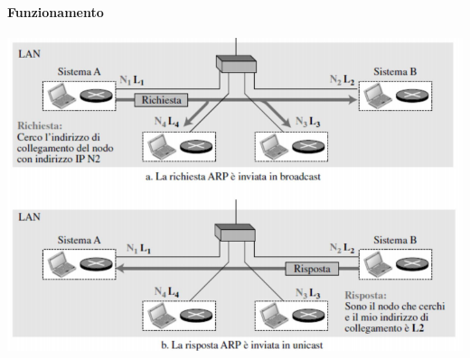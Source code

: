 \documentclass[10pt]{article}
\begin{document}
\paragraph{Funzionamento}
\begin{center}
\includegraphics[scale=0.7]{arpfunz.png}
\end{center}
\pagebreak
\end{document}
